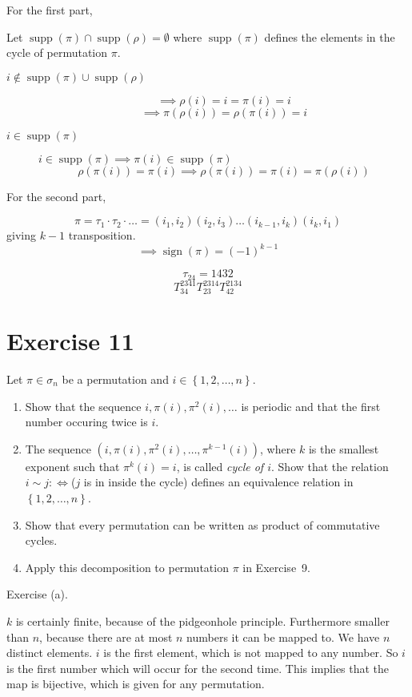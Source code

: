 \documentclass[a4paper]{article}
\theoremstyle{definition}
\DeclareMathOperator\sign{sign}
\newcommand\set[1]{\left\{#1\right\}}
\begin{document}
For the first part,

Let $\operatorname{supp}(\pi) \cap \operatorname{supp}(\rho) = \emptyset$ where $\operatorname{supp}(\pi)$ defines the elements in the cycle of permutation $\pi$.
\begin{description}
  \item[$i \not\in \operatorname{supp}(\pi) \cup \operatorname{supp}(\rho)$] 
    \[ \implies \rho(i) = i = \pi(i) = i \]
    \[ \implies \pi(\rho(i)) = \rho(\pi(i)) = i \]
  \item[$i \in \operatorname{supp}(\pi)$]
    $i \in \operatorname{supp}(\pi) \implies \pi(i) \in \operatorname{supp}(\pi)$
    \[ \rho(\pi(i)) = \pi(i) \implies \rho(\pi(i)) = \pi(i) = \pi(\rho(i)) \]
\end{description}

For the second part,

\[ \pi = \tau_1 \cdot \tau_2 \cdot \dots = (i_1, i_2) (i_2, i_3) \dots (i_{k-1}, i_k) (i_k, i_1) \]
giving $k-1$ transposition.
\[ \implies \sign(\pi) = (-1)^{k-1} \]

\[ \tau_{24} = 1432 \]
\[ T_{34}^{2341} T_{23}^{2314} T_{42}^{2134} \]

\section{Exercise 11}
\begin{ex}
  Let $\pi \in \sigma_n$ be a permutation and $i \in \set{1, 2, \dots, n}$.
  \begin{enumerate}
    \item Show that the sequence $i, \pi(i), \pi^2(i), \dots$ is periodic and that the first number occuring twice is $i$.
    \item The sequence $(i, \pi(i), \pi^2(i), \dots, \pi^{k-1}(i))$, where $k$ is the smallest exponent such that $\pi^k(i) = i$, is called \emph{cycle of $i$}. Show that the relation $i \sim j : \iff $($j$ is in inside the cycle) defines an equivalence relation in $\set{1,2,\dots,n}$.
    \item Show that every permutation can be written as product of commutative cycles.
    \item Apply this decomposition to permutation $\pi$ in Exercise~9.
  \end{enumerate}
\end{ex}

Exercise (a).

$k$ is certainly finite, because of the pidgeonhole principle. Furthermore smaller than $n$, because there are at most $n$ numbers it can be mapped to. We have $n$ distinct elements. $i$ is the first element, which is not mapped to any number. So $i$ is the first number which will occur for the second time. This implies that the map is bijective, which is given for any permutation.
\end{document}
